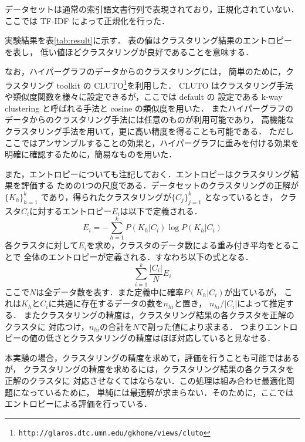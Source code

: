 \documentclass[japanese]{jnlp_1.3e}
\begin{document}
データセットは通常の索引語文書行列で表現されており，正規化されていない．
ここでは TF-IDF によって正規化を行った．

\begin{table}[tbp]

\end{table}


\begin{table}[tbp]

\end{table}

実験結果を\mbox{表\ref{tab:result}}に示す．
表の値はクラスタリング結果のエントロピーを表し，
低い値ほどクラスタリングが良好であることを意味する．

なお，ハイパーグラフのデータからのクラスタリングには，
簡単のために，クラスタリング toolkit の CLUTO\footnote{
	{\tt http://glaros.dtc.umn.edu/gkhome/views/cluto}}を利用した．
CLUTO はクラスタリング手法や類似度関数を様々に設定できるが，ここでは default の
設定である k-way clustering と呼ばれる手法と cosine の類似度を用いた．
またハイパーグラフのデータからのクラスタリング手法には任意のものが利用可能であり，
高機能なクラスタリング手法を用いて，更に高い精度を得ることも可能である．
ただしここではアンサンブルすることの効果と，ハイパーグラフに重みを付ける効果を
明確に確認するために，簡易なものを用いた．

また，エントロピーについても注記しておく．エントロピーはクラスタリング結果を評価する
ための1つの尺度である．データセットのクラスタリングの正解が\( \{ K_h \}_{h=1}^{k} \)
であり，得られたクラスタリングが\( \{ C_j \}_{j=1}^{k} \) となっているとき，
クラスタ\( C_i \)に対するエントロピー\( E_i \)は以下で定義される．
\[
E_{i} = - \sum_{h = 1}^{k} P(K_{h}|C_i) \log P(K_{h}|C_i)
\]
各クラスタに対して\( E_i \)を求め，クラスタのデータ数による重み付き平均をとることで
全体のエントロピーが定義される．すなわち以下の式となる．
\[
\sum_{i=1}^{k} \frac{|C_i|}{N} E_{i}
\]
ここで\( N \)は全データ数を表す．また定義中に確率\( P(K_{h}|C_i) \)が出ているが，
これは\( K_{h} \)と\( C_i \)に共通に存在するデータの数を\( n_{hi} \)と置き，
\( n_{hi}/|C_i| \)によって推定する．
またクラスタリングの精度は，クラスタリング結果の各クラスタを正解のクラスタに
対応つけ，\( n_{hi} \)の合計を\( N \)で割った値により求まる．
つまりエントロピーの値の低さとクラスタリングの精度はほぼ対応していると見なせる．

本実験の場合，クラスタリングの精度を求めて，評価を行うことも可能ではあるが，
クラスタリングの精度を求めるには，クラスタリング結果の各クラスタを正解のクラスタに
対応させなくてはならない．この処理は組み合わせ最適化問題になっているために，
単純には最適解が求まらない．そのために，ここではエントロピーによる評価を行っている．
\end{document}
